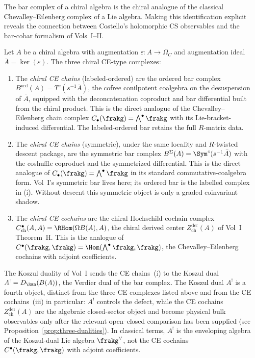 The bar complex of a chiral algebra is the chiral analogue of the classical Chevalley--Eilenberg complex of a Lie algebra. Making this identification explicit reveals the connection between Costello's holomorphic CS observables and the bar-cobar formalism of Vols~I--II.

\begin{construction}
\label{constr:chiral-ce}
Let $A$ be a chiral algebra with augmentation $\varepsilon \colon A \to \Omega_C$ and augmentation ideal $\bar{A} = \ker(\varepsilon)$. The three chiral CE-type complexes:
\begin{enumerate}[label=\textup{(\roman*)}]
 \item The \emph{chiral CE chains} (labeled-ordered) are the ordered bar complex $B^{\mathrm{ord}}(A) = T^c(s^{-1}\bar{A})$, the cofree conilpotent coalgebra on the desuspension of $\bar{A}$, equipped with the deconcatenation coproduct and bar differential built from the chiral product. This is the direct analogue of the Chevalley--Eilenberg chain complex $C_\bullet(\frakg) = \bigwedge^\bullet \frakg$ with its Lie-bracket-induced differential. The labeled-ordered bar retains the full $R$-matrix data.

 \item The \emph{chiral CE chains} (symmetric), under the same locality
 and $R$-twisted descent package, are the symmetric bar complex
 $B^{\Sigma}(A) = \Sym^c(s^{-1}\bar{A})$ with the coshuffle coproduct
 and the symmetrized differential. This is the direct analogue of
 $C_\bullet(\frakg) = \bigwedge^\bullet \frakg$ in its standard
 commutative-coalgebra form. Vol~I's symmetric bar lives here; its
 ordered bar is the labelled complex in \textup{(i)}. Without descent
 this symmetric object is only a graded coinvariant shadow.

 \item The \emph{chiral CE cochains} are the chiral Hochschild cochain
 complex $C^\bullet_{\mathrm{ch}}(A, A)=\RHom(\Omega B(A), A)$, the
 chiral derived center $Z^{\mathrm{der}}_{\mathrm{ch}}(A)$ of Vol~I
 Theorem~H. This is the analogue of
 $C^\bullet(\frakg, \frakg)=\Hom(\bigwedge^\bullet \frakg,\frakg)$,
 the Chevalley--Eilenberg cochains with adjoint coefficients.
\end{enumerate}
The Koszul duality of Vol~I sends the CE chains~(i) to the Koszul
dual $A^!=D_{\Ran}(B(A))$, the Verdier dual of the bar complex. The
Koszul dual $A^!$ is a fourth object, distinct from the three CE
complexes listed above and from the CE cochains~(iii) in particular:
$A^!$ controls the defect, while the CE cochains
$Z^{\mathrm{der}}_{\mathrm{ch}}(A)$ are the algebraic closed-sector
object and become physical bulk observables only after the relevant
open--closed comparison has been supplied
(see Proposition~\ref{prop:three-dualities}). In classical terms,
$A^!$ is the enveloping algebra of the Koszul-dual Lie algebra
$\frakg^\vee$, not the CE cochains
$C^\bullet(\frakg,\frakg)$ with adjoint coefficients.
\end{construction}


